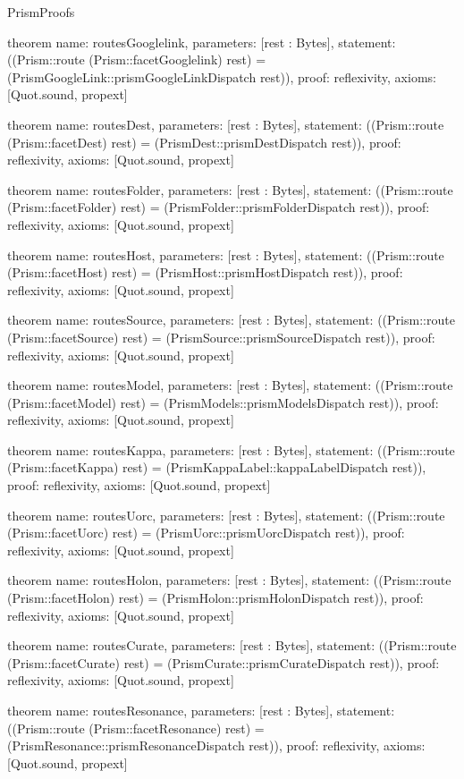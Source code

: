 \begin{lexlean}{PrismProofs}
\begin{semanticmodule}
theorem{
  name: routesGooglelink,
  parameters: [rest : Bytes],
  statement: ((Prism::route (Prism::facetGooglelink) rest) = (PrismGoogleLink::prismGoogleLinkDispatch rest)),
  proof: reflexivity{},
  axioms: [Quot.sound, propext]
}

theorem{
  name: routesDest,
  parameters: [rest : Bytes],
  statement: ((Prism::route (Prism::facetDest) rest) = (PrismDest::prismDestDispatch rest)),
  proof: reflexivity{},
  axioms: [Quot.sound, propext]
}

theorem{
  name: routesFolder,
  parameters: [rest : Bytes],
  statement: ((Prism::route (Prism::facetFolder) rest) = (PrismFolder::prismFolderDispatch rest)),
  proof: reflexivity{},
  axioms: [Quot.sound, propext]
}

theorem{
  name: routesHost,
  parameters: [rest : Bytes],
  statement: ((Prism::route (Prism::facetHost) rest) = (PrismHost::prismHostDispatch rest)),
  proof: reflexivity{},
  axioms: [Quot.sound, propext]
}

theorem{
  name: routesSource,
  parameters: [rest : Bytes],
  statement: ((Prism::route (Prism::facetSource) rest) = (PrismSource::prismSourceDispatch rest)),
  proof: reflexivity{},
  axioms: [Quot.sound, propext]
}

theorem{
  name: routesModel,
  parameters: [rest : Bytes],
  statement: ((Prism::route (Prism::facetModel) rest) = (PrismModels::prismModelsDispatch rest)),
  proof: reflexivity{},
  axioms: [Quot.sound, propext]
}

theorem{
  name: routesKappa,
  parameters: [rest : Bytes],
  statement: ((Prism::route (Prism::facetKappa) rest) = (PrismKappaLabel::kappaLabelDispatch rest)),
  proof: reflexivity{},
  axioms: [Quot.sound, propext]
}

theorem{
  name: routesUorc,
  parameters: [rest : Bytes],
  statement: ((Prism::route (Prism::facetUorc) rest) = (PrismUorc::prismUorcDispatch rest)),
  proof: reflexivity{},
  axioms: [Quot.sound, propext]
}

theorem{
  name: routesHolon,
  parameters: [rest : Bytes],
  statement: ((Prism::route (Prism::facetHolon) rest) = (PrismHolon::prismHolonDispatch rest)),
  proof: reflexivity{},
  axioms: [Quot.sound, propext]
}

theorem{
  name: routesCurate,
  parameters: [rest : Bytes],
  statement: ((Prism::route (Prism::facetCurate) rest) = (PrismCurate::prismCurateDispatch rest)),
  proof: reflexivity{},
  axioms: [Quot.sound, propext]
}

theorem{
  name: routesResonance,
  parameters: [rest : Bytes],
  statement: ((Prism::route (Prism::facetResonance) rest) = (PrismResonance::prismResonanceDispatch rest)),
  proof: reflexivity{},
  axioms: [Quot.sound, propext]
}


\end{semanticmodule}
\end{lexlean}
